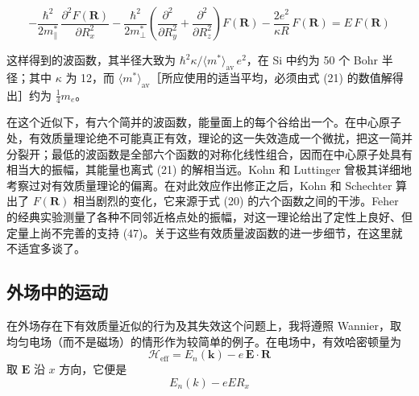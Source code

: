 \begin{equation*}
-\frac{\hbar^2}{2m^*_{\parallel}}\, \frac{\partial^2 F(\mathbf{R})}{\partial R_x^2} - \frac{\hbar^2}{2m^*_{\perp}} \left(\frac{\partial^2}{\partial R_y^2} + \frac{\partial^2}{\partial R_z^2}\right) F(\mathbf{R}) - \frac{2e^2}{\kappa R}\, F(\mathbf{R}) = E\, F(\mathbf{R}) \tag{21}
\end{equation*}

这样得到的波函数，其半径大致为 $\hbar^2 \kappa / \langle m^* \rangle_{\text{av}}\, e^2$，在 Si 中约为 50 个 Bohr 半径；其中 $\kappa$ 为 12，而 $\langle m^* \rangle_{\text{av}}$［所应使用的适当平均，必须由式 (21) 的数值解得出］约为 $\frac{1}{4} m_e$。

在这个近似下，有六个简并的波函数，能量面上的每个谷给出一个。在中心原子处，有效质量理论绝不可能真正有效，理论的这一失效造成一个微扰，把这一简并分裂开；最低的波函数是全部六个函数的对称化线性组合，因而在中心原子处具有相当大的振幅，其能量也离式 (21) 的解相当远。Kohn 和 Luttinger 曾极其详细地考察过对有效质量理论的偏离。在对此效应作出修正之后，Kohn 和 Schechter 算出了 $F(\mathbf{R})$ 相当剧烈的变化，它来源于式 (20) 的六个函数之间的干涉。Feher 的经典实验测量了各种不同邻近格点处的振幅，对这一理论给出了定性上良好、但定量上尚不完善的支持 (47)。关于这些有效质量波函数的进一步细节，在这里就不适宜多谈了。



\subsection{外场中的运动}

在外场存在下有效质量近似的行为及其失效这个问题上，我将遵照 Wannier，取均匀电场（而不是磁场）的情形作为较简单的例子。在电场中，有效哈密顿量为
\begin{equation*}
\mathcal{H}_{\text{eff}} = E_n(\mathbf{k}) - e\,\mathbf{E}\cdot\mathbf{R}
\end{equation*}
取 $\mathbf{E}$ 沿 $x$ 方向，它便是
\begin{equation*}
E_n(k) - eER_x
\end{equation*}


